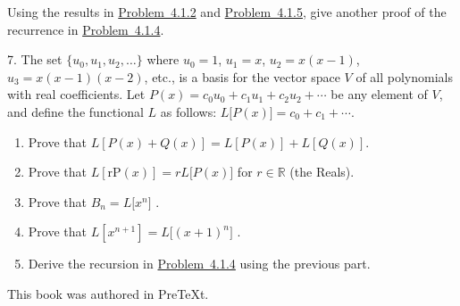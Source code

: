 \documentclass[10pt,]{book}
\theoremstyle{plain}
\theoremstyle{definition}
\theoremstyle{definition}
\numberwithin{equation}{chapter}
\def\R{\mathbb R}
\begin{document}
\begin{exerciselist}
Using the results in \hyperlink{ex-bell-as-stirlings}{Problem~4.1.2} and \hyperlink{ex-stirling-recurrence}{Problem~4.1.5}, give another proof of the recurrence in \hyperlink{ex-bell-recurrence}{Problem~4.1.4}.%
\par\smallskip
\item[7.]\hypertarget{exercise-64}{}\hypertarget{p-172}{}%
The set \(\{u_{0}, u_{1}, u_{2}, \ldots \}\) where \(u_{0} = 1\), \(u_{1} = x\), \(u_{2} = x(x - 1)\), \(u_{3} = x(x - 1)(x - 2)\), etc., is a basis for the vector space \(V\) of all polynomials with real coefficients. Let \(P(x) = c_{0}u_{0} + c_{1}u_{1} + c_{2}u_{2} + \cdots\) be any element of \(V\), and define the functional \(L\) as follows: \(L\lbrack P(x)\rbrack = c_{0} + c_{1} + \cdots\).%
\par
\hypertarget{p-173}{}%
\leavevmode%
\begin{enumerate}[label=(\alph*)]
\item\hypertarget{li-33}{}\hypertarget{p-174}{}%
Prove that \(L\left\lbrack P\left( x \right) + Q\left( x \right) \right\rbrack = L\left\lbrack P\left( x \right) \right\rbrack + L\left\lbrack Q\left( x \right) \right\rbrack.\)%
\item\hypertarget{li-34}{}\hypertarget{p-175}{}%
Prove that \(L\left\lbrack \text{rP}\left( x \right) \right\rbrack = rL\lbrack P\left( x \right)\rbrack\) for \(r \in \R\) (the Reals).%
\item\hypertarget{li-35}{}\hypertarget{p-176}{}%
Prove that \(B_{n} = L\lbrack x^{n}\rbrack\) .%
\item\hypertarget{li-36}{}\hypertarget{p-177}{}%
Prove that \(L\left\lbrack x^{n + 1} \right\rbrack = L\lbrack\left( x + 1 \right)^{n}\rbrack\) .%
\item\hypertarget{li-37}{}\hypertarget{p-178}{}%
Derive the recursion in \hyperlink{ex-bell-recurrence}{Problem~4.1.4} using the previous part.%
\end{enumerate}
%
\par\smallskip
\end{exerciselist}
%
\backmatter
%
%
%
\cleardoublepage
\pagestyle{empty}
\hypertarget{colophon-2}{}
\centerline{\hypertarget{p-179}{}%
This book was authored in PreTeXt.%
}
\end{document}
